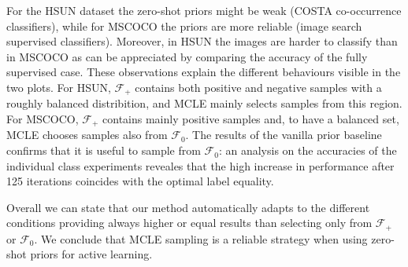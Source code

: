 \documentclass[10pt,twocolumn,letterpaper]{article}
\begin{document}
For the HSUN dataset the zero-shot priors might be weak (COSTA co-occurrence classifiers),
while for MSCOCO the priors are more reliable (image search supervised classifiers). Moreover,
in HSUN the images are harder to classify than in MSCOCO as can be appreciated by comparing the accuracy
of the fully supervised case. These observations explain the different behaviours visible in the
two plots. For HSUN, $\mathcal{F}_+$ contains both positive and negative samples with a roughly 
balanced distribition, and MCLE mainly selects samples from this region. For MSCOCO, $\mathcal{F}_+$ contains mainly positive
samples and, to have a balanced set, MCLE chooses samples also from $\mathcal{F}_0$. The results of the vanilla prior
baseline confirms that it is useful to sample from $\mathcal{F}_0$: an analysis on the 
accuracies of the individual class experiments reveales that the high increase in performance after 125 iterations
coincides with the optimal label equality.

Overall we can state that our method automatically adapts to the different conditions providing always higher 
or equal results than selecting only from $\mathcal{F}_+$ or $\mathcal{F}_0$. We conclude that MCLE sampling 
is a reliable strategy when using zero-shot priors for active learning.
\end{document}
